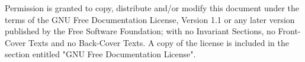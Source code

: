 \newpage
\thispagestyle{empty}
\cleardoublepage
\vspace*{9cm}

Permission is granted to copy, distribute and/or modify this
document under the terms of the GNU Free Documentation License,
Version 1.1 or any later version published by the Free Software
Foundation; with no Invariant Sections, no Front-Cover Texts and
no Back-Cover Texts.  A copy of the license is included in the
section entitled "GNU Free Documentation License".


\cleardoublepage
\endinput
